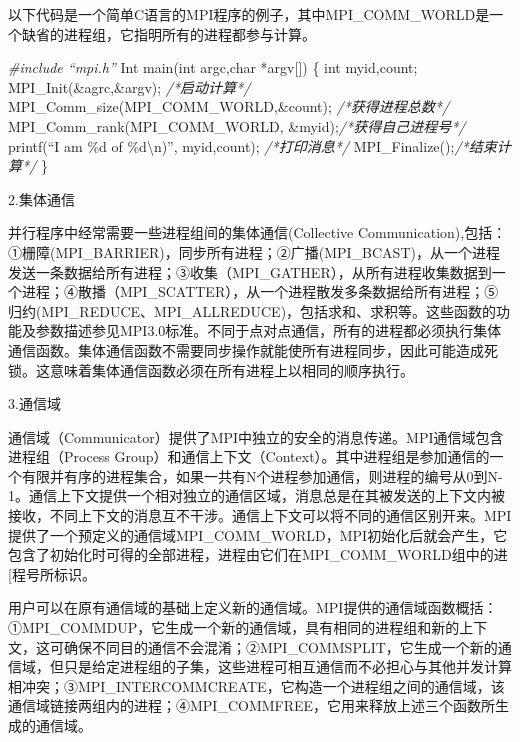 \documentclass[]{ctexbook}
\newenvironment{Shaded}{\begin{snugshade}}{\end{snugshade}}
\newcommand{\CommentTok}[1]{\textcolor[rgb]{0.56,0.35,0.01}{\textit{#1}}}
\newcommand{\DataTypeTok}[1]{\textcolor[rgb]{0.13,0.29,0.53}{#1}}
\newcommand{\NormalTok}[1]{#1}
\newcommand{\PreprocessorTok}[1]{\textcolor[rgb]{0.56,0.35,0.01}{\textit{#1}}}
\begin{document}
以下代码是一个简单C语言的MPI程序的例子，其中MPI\_COMM\_WORLD是一个缺省的进程组，它指明所有的进程都参与计算。

\begin{Shaded}
\begin{Highlighting}[]
\PreprocessorTok{\#include “mpi.h”}
\NormalTok{Int main(}\DataTypeTok{int}\NormalTok{ argc,}\DataTypeTok{char}\NormalTok{ *argv[])}
\NormalTok{\{  }\DataTypeTok{int}\NormalTok{ myid,count;}
\NormalTok{   MPI\_Init(\&agrc,\&argv); }\CommentTok{/*启动计算*/}
\NormalTok{   MPI\_Comm\_size(MPI\_COMM\_WORLD,\&count); }\CommentTok{/*获得进程总数*/}
\NormalTok{   MPI\_Comm\_rank(MPI\_COMM\_WORLD, \&myid);}\CommentTok{/*获得自己进程号*/}
\NormalTok{   printf(“I am \%d of \%d\textbackslash{}n)”, myid,count);  }\CommentTok{/*打印消息*/}
\NormalTok{   MPI\_Finalize();}\CommentTok{/*结束计算*/}
\NormalTok{\}}
\end{Highlighting}
\end{Shaded}

2.集体通信

并行程序中经常需要一些进程组间的集体通信(Collective Communication),包括：①栅障(MPI\_BARRIER)，同步所有进程；②广播(MPI\_BCAST)，从一个进程发送一条数据给所有进程；③收集（MPI\_GATHER），从所有进程收集数据到一个进程；④散播（MPI\_SCATTER），从一个进程散发多条数据给所有进程；⑤归约(MPI\_REDUCE、MPI\_ALLREDUCE)，包括求和、求积等。这些函数的功能及参数描述参见MPI3.0标准。不同于点对点通信，所有的进程都必须执行集体通信函数。集体通信函数不需要同步操作就能使所有进程同步，因此可能造成死锁。这意味着集体通信函数必须在所有进程上以相同的顺序执行。

3.通信域

通信域（Communicator）提供了MPI中独立的安全的消息传递。MPI通信域包含进程组（Process Group）和通信上下文（Context）。其中进程组是参加通信的一个有限并有序的进程集合，如果一共有N个进程参加通信，则进程的编号从0到N-1。通信上下文提供一个相对独立的通信区域，消息总是在其被发送的上下文内被接收，不同上下文的消息互不干涉。通信上下文可以将不同的通信区别开来。MPI提供了一个预定义的通信域MPI\_COMM\_WORLD，MPI初始化后就会产生，它包含了初始化时可得的全部进程，进程由它们在MPI\_COMM\_WORLD组中的进{[}程号所标识。

用户可以在原有通信域的基础上定义新的通信域。MPI提供的通信域函数概括：①MPI\_COMMDUP，它生成一个新的通信域，具有相同的进程组和新的上下文，这可确保不同目的通信不会混淆；②MPI\_COMMSPLIT，它生成一个新的通信域，但只是给定进程组的子集，这些进程可相互通信而不必担心与其他并发计算相冲突；③MPI\_INTERCOMMCREATE，它构造一个进程组之间的通信域，该通信域链接两组内的进程；④MPI\_COMMFREE，它用来释放上述三个函数所生成的通信域。
\end{document}
